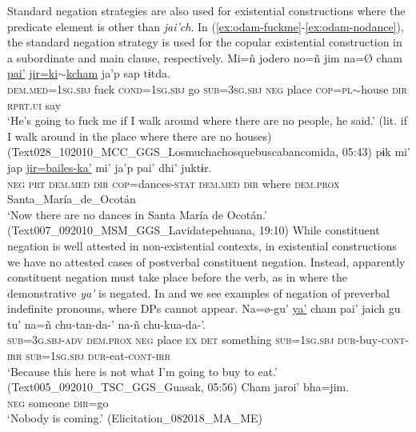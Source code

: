 \documentclass[output=paper,draft,draftmode,colorlinks,citecolor=brown]{langscibook}
\begin{document}
Standard negation strategies are also used for existential constructions where the predicate element is other than \emph{jai’ch}. In 
(\ref{ex:odam-fuckme}-\ref{ex:odam-nodance}), the standard negation strategy is used for the copular existential construction in a subordinate and main clause, respectively.
\ea
\label{ex:odam-fuckme}
\gll Mi=ñ 	jodero 	no=ñ	jim na=Ø 	cham 	\uline{pai’}	\uline{jir=ki$\sim$kcham} ja’p 	sap 	tɨtda.\\
\textsc{dem.med=1sg.sbj}	fuck	\textsc{cond=1sg.sbj}	go	\textsc{sub=3sg.sbj}	\textsc{neg}	place	\textsc{cop=pl}$\sim$house		\textsc{dir}	\textsc{rprt.ui}	say\\
\glt ‘He's going to fuck me if I walk around where there are no people, he said.’ (lit. if I walk around in the place where there are no houses) (Text028\_102010\_MCC\_GGS\_Losmuchachosquebuscabancomida, 05:43)
\z 
\ea
\label{ex:odam-nodance}
 	pɨk	mi' 	jap	\uline{jir=bailes-ka'}		mi'	ja’p	pai' dhi' 	juktɨr.\\
\textsc{neg}		\textsc{prt}	\textsc{dem.med}	\textsc{dir} 	\textsc{cop}=dances-\textsc{stat} 	\textsc{dem.med} 	\textsc{dir} 	where \textsc{dem.prox}  	Santa\_María\_de\_Ocotán\\
\glt ‘Now there are no dances in Santa María de Ocotán.’ (Text007\_092010\_MSM\_GGS\_Lavidatepehuana, 19:10)
\z 
While constituent negation is well attested in non-existential contexts, in existential constructions we have no attested cases of postverbal constituent negation. Instead, apparently constituent negation must take place before the verb, as in  where the demonstrative \emph{ya'} is negated. In  and  we see examples of negation of preverbal indefinite pronouns, where DPs cannot appear. 
\ea
\label{ex:odam-buyeat}
\gll Na=\o-gu’	\uline{ya'}	cham pai'  jaich 		gu  	tu' na=ñ             		chu-tan-da-'	na-ñ            	chu-kua-da-'.\\
\textsc{sub=3g.sbj-adv}	\textsc{dem.prox} 	\textsc{neg}	place		\textsc{ex} 	\textsc{det}	something	 \textsc{sub=1sg.sbj}		\textsc{dur}-buy-\textsc{cont-irr}	\textsc{sub=1sg.sbj} \textsc{dur}-eat-\textsc{cont-irr}\\
\glt ‘Because this here is not what I’m going to buy to eat.’ (Text005\_092010\_TSC\_GGS\_Guasak, 05:56)
\z 
\ea
\label{ex:odam-nobody}
\gll Cham	jaroi’ 		bha=jim.\\
\textsc{neg}	someone	\textsc{dir}=go\\
\glt ‘Nobody is coming.’ (Elicitation\_082018\_MA\_ME)
\end{document}
